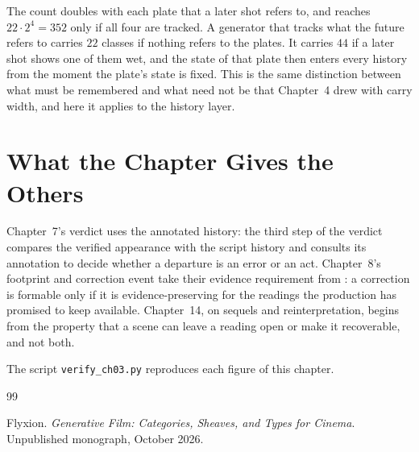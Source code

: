 \documentclass[11pt,twoside,openright]{book}
\theoremstyle{plain}
\theoremstyle{definition}
\theoremstyle{remark}
\begin{document}
The count doubles with each plate that a later shot refers to, and reaches $22\cdot2^4=352$ only if all four are tracked. A generator that tracks what the future refers to carries $22$ classes if nothing refers to the plates. It carries $44$ if a later shot shows one of them wet, and the state of that plate then enters every history from the moment the plate's state is fixed. This is the same distinction between what must be remembered and what need not be that Chapter~4 drew with carry width, and here it applies to the history layer.

\section{What the Chapter Gives the Others}\label{sec:gives3}

Chapter~7's verdict uses the annotated history: the third step of the verdict compares the verified appearance with the script history and consults its annotation to decide whether a departure is an error or an act. Chapter~8's footprint and correction event take their evidence requirement from : a correction is formable only if it is evidence-preserving for the readings the production has promised to keep available. Chapter~14, on sequels and reinterpretation, begins from the property that a scene can leave a reading open or make it recoverable, and not both.

The script \texttt{verify\_ch03.py} reproduces each figure of this chapter.

\begin{thebibliography}{99}

Flyxion.
\newblock \emph{Generative Film: Categories, Sheaves, and Types for Cinema}.
\newblock Unpublished monograph, October 2026.

\end{thebibliography}
\end{document}
